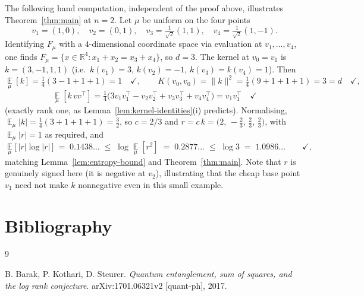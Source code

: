 \documentclass{aicr-solution}
\newcommand{\Expect}{\operatorname*{\mathbb{E}}}
\newcommand{\Reals}{\mathbb{R}}
\begin{document}
The following hand computation, independent of the proof above,
illustrates Theorem~\ref{thm:main} at $n=2$. Let $\mu$ be uniform on
the four points
\[
  v_{1} = (1,0), \quad v_{2} = (0,1), \quad v_{3} =
  \tfrac{1}{\sqrt2}(1,1), \quad v_{4} = \tfrac{1}{\sqrt2}(1,-1).
\]
Identifying $F_{\mu}$ with a $4$-dimensional coordinate space via
evaluation at $v_{1},\dots,v_{4}$, one finds $F_{\mu} = \{x \in
\Reals^{4} : x_{1}+x_{2} = x_{3}+x_{4}\}$, so $d = 3$. The kernel at
$v_{0} = v_{1}$ is $k = (3,-1,1,1)$ (i.e.\ $k(v_{1})=3$,
$k(v_{2})=-1$, $k(v_{3})=k(v_{4})=1$). Then
\[
  \Expect_{\mu}[k] = \tfrac14(3-1+1+1) = 1 \quad\checkmark, \qquad
  K(v_{0},v_{0}) = \|k\|^{2} = \tfrac14(9+1+1+1) = 3 = d
  \quad\checkmark,
\]
\[
  \Expect_{\mu}[k\,vv^{\top}] = \tfrac14\Big(3v_{1}v_{1}^{\top} -
  v_{2}v_{2}^{\top} + v_{3}v_{3}^{\top} + v_{4}v_{4}^{\top}\Big) =
  v_{1}v_{1}^{\top} \quad\checkmark
\]
(exactly rank one, as Lemma~\ref{lem:kernel-identities}(i) predicts).
Normalising, $\Expect_{\mu}|k| = \tfrac14(3+1+1+1) = \tfrac32$, so $c =
2/3$ and $r = c\,k = \big(2,\,-\tfrac23,\,\tfrac23,\,\tfrac23\big)$,
with $\Expect_{\mu}|r| = 1$ as required, and
\[
  \Expect_{\mu}\big[\,|r|\log|r|\,\big] \;=\; 0.1438\ldots \;\le\;
  \log \Expect_{\mu}[r^{2}] \;=\; 0.2877\ldots \;\le\; \log 3 \;=\;
  1.0986\ldots \qquad \checkmark,
\]
matching Lemma~\ref{lem:entropy-bound} and Theorem~\ref{thm:main}.
Note that $r$ is genuinely signed here (it is negative at $v_{2}$),
illustrating that the cheap base point $v_{1}$ need not make $k$
nonnegative even in this small example.

\section{Bibliography}

\begin{aicrbibliography}{9}

B. Barak, P. Kothari, D. Steurer.
\emph{Quantum entanglement, sum of squares, and the log rank
conjecture}.
arXiv:1701.06321v2 [quant-ph], 2017.

\end{aicrbibliography}
\end{document}
